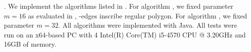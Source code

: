 





.
We implement the algorithms listed in .
For algorithm \cised, we fixed parameter $m=16$ as evaluated in \cite{Lin:Cised}, -edges inscribe regular polygon.
For algorithm \nopts, we fixed parameter $m=32$. 
All algorithms were implemented with Java.
All tests were run on an x64-based  PC with 4 Intel(R) Core(TM) i5-4570 CPU @ 3.20GHz  and 16GB of memory.


